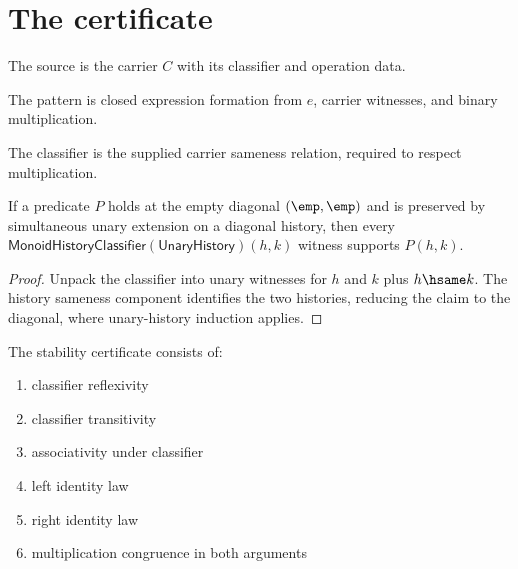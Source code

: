 \section{The certificate}

\begin{definition}
\label{def:monoid-source-specification}
The source is the carrier \(C\) with its classifier and operation data.
\end{definition}

\begin{definition}
\label{def:monoid-pattern-specification}
The pattern is closed expression formation from \(e\), carrier witnesses, and binary multiplication.
\end{definition}

\begin{definition}
\label{def:monoid-classifier-specification}
The classifier is the supplied carrier sameness relation, required to respect multiplication.
\end{definition}

\begin{theorem}
\label{thm:monoid-history-classifier-unary-diagonal-induction}
If a predicate \(P\) holds at the empty diagonal \((\emp,\emp)\) and is
preserved by simultaneous unary extension on a diagonal history, then every
\(\mathsf{MonoidHistoryClassifier}(\mathsf{UnaryHistory})(h,k)\) witness
supports \(P(h,k)\).
\end{theorem}
\begin{proof}
Unpack the classifier into unary witnesses for \(h\) and \(k\) plus
\(h\hsame k\). The history sameness component identifies the two histories,
reducing the claim to the diagonal, where unary-history induction applies.
\end{proof}

\begin{definition}
\label{def:monoid-stability-certificate}
The stability certificate consists of:
\begin{enumerate}
  \item classifier reflexivity
  \item classifier transitivity
  \item associativity under classifier
  \item left identity law
  \item right identity law
  \item multiplication congruence in both arguments
\end{enumerate}
\end{definition}

